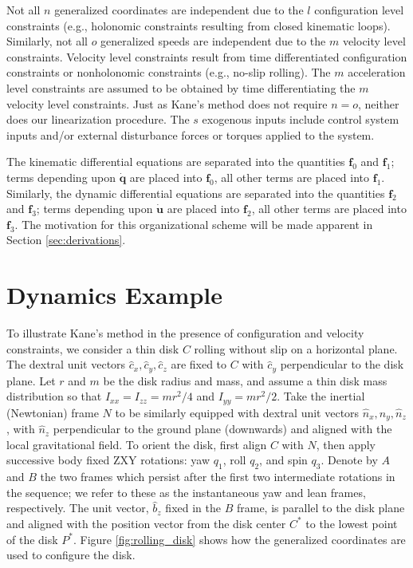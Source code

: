 \documentclass[smallcondensed,final]{svjour3}                     %
\begin{document}
Not all $n$ generalized coordinates are independent due to the $l$
configuration level constraints (e.g., holonomic constraints resulting from
closed kinematic loops). Similarly, not all $o$ generalized speeds are
independent due to the $m$ velocity level constraints.  Velocity level
constraints result from time differentiated configuration constraints or
nonholonomic constraints (e.g., no-slip rolling).  The $m$ acceleration level
constraints are assumed to be obtained by time differentiating the $m$ velocity
level constraints.  Just as Kane's method does not require $n = o$, neither
does our linearization procedure. The $s$ exogenous inputs include control
system inputs and/or external disturbance forces or torques applied to the
system.

The kinematic differential equations are separated into the quantities
$\mathbf{f}_0$ and $\mathbf{f}_1$; terms depending upon $\dot{\mathbf{q}}$ are
placed into $\mathbf{f}_0$, all other terms are placed into $\mathbf{f}_1$.
Similarly, the dynamic differential equations are separated into the
quantities $\mathbf{f}_2$ and $\mathbf{f}_3$; terms depending upon
$\dot{\mathbf{u}}$ are placed into $\mathbf{f}_2$, all other terms are placed
into $\mathbf{f}_3$. The motivation for this organizational scheme will be made
apparent in Section \ref{sec:derivations}.


\section{Dynamics Example}
\label{sec:example}
To illustrate Kane's method in the presence of configuration and velocity
constraints, we consider a thin disk $C$ rolling without slip on a horizontal
plane. The dextral unit vectors $\hat{c}_x, \hat{c}_y, \hat{c}_z$ are fixed to $C$
with $\hat{c}_y$ perpendicular to the disk plane. Let $r$ and $m$ be the
disk radius and mass, and assume a thin disk mass distribution so that
$I_{xx}=I_{zz}=mr^2/4$ and $I_{yy} = mr^2/2$. Take the inertial (Newtonian)
frame $N$ to be similarly equipped with dextral unit vectors $\hat{n}_x,
\hat{n}_y, \hat{n}_z$, with $\hat{n}_z$ perpendicular to the ground plane
(downwards) and aligned with the local gravitational field. To orient the disk,
first align $C$ with $N$, then apply successive body fixed ZXY rotations:
yaw $q_1$, roll $q_2$, and spin $q_3$.  Denote by $A$ and $B$ the two frames
which persist after the first two intermediate rotations in the sequence; we
refer to these as the instantaneous yaw and lean frames, respectively. The unit
vector, $\hat{b}_z$ fixed in the $B$ frame, is parallel to the disk plane and
aligned with the position vector from the disk center $C^*$ to the lowest point
of the disk $P^*$. Figure \ref{fig:rolling_disk} shows how the generalized
coordinates are used to configure the disk.
\end{document}
